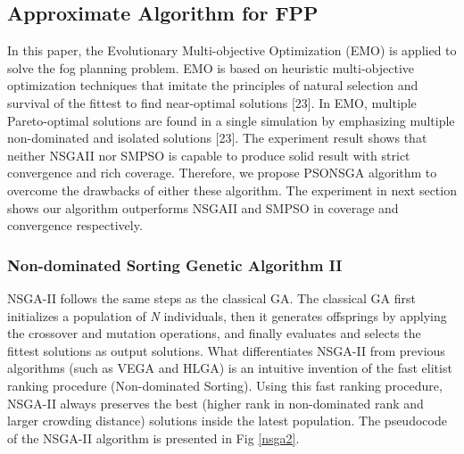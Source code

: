 \documentclass[10pt,journal,compsoc]{IEEEtran}
\begin{document}
\subsection{Approximate Algorithm for FPP}\label{sec:approximate}
In this paper, the Evolutionary Multi-objective Optimization (EMO) is applied to solve the fog planning problem. EMO is based on heuristic multi-objective optimization techniques that imitate the principles of natural selection and survival of the fittest to find near-optimal solutions [23]. In EMO, multiple Pareto-optimal solutions are found in a single simulation by emphasizing multiple non-dominated and isolated solutions [23].
The experiment result shows that neither NSGAII nor SMPSO is capable to produce solid result with strict convergence and rich coverage. Therefore, we propose PSONSGA algorithm to overcome the drawbacks of either these algorithm. The experiment in next section shows our algorithm outperforms NSGAII and SMPSO in coverage and convergence respectively.

\subsubsection{Non-dominated Sorting Genetic Algorithm II}
NSGA-II follows the same steps as the classical GA. The classical GA first initializes a population of \textit{N} individuals, then it generates offsprings by applying the crossover and mutation operations, and finally evaluates and selects the fittest solutions as output solutions. What differentiates NSGA-II from previous algorithms (such as VEGA and HLGA) is an intuitive invention of the fast elitist ranking procedure (Non-dominated Sorting). Using this fast ranking procedure, NSGA-II always preserves the best (higher rank in non-dominated rank and larger crowding distance) solutions inside the latest population. 
The pseudocode of the NSGA-II algorithm is presented in Fig \ref{nsga2}.
\end{document}
